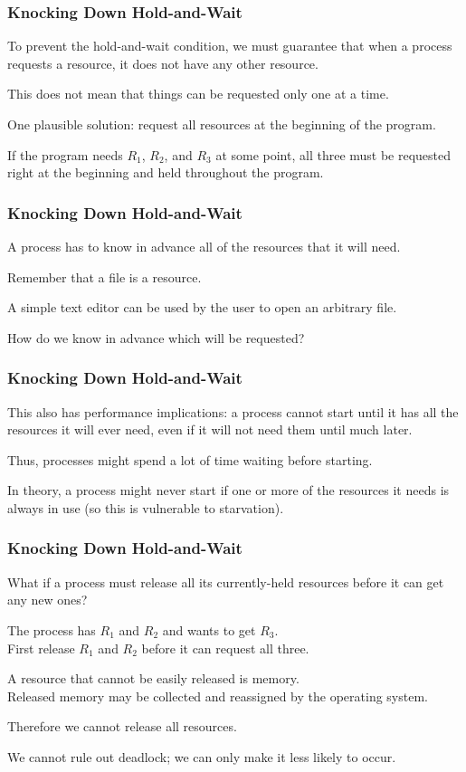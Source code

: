 \begin{frame}
	\frametitle{Knocking Down Hold-and-Wait}
	To prevent the hold-and-wait condition, we must guarantee that when a process requests a resource, it does not have any other resource.

	This does not mean that things can be requested only one at a time.

	One plausible solution: request all resources at the beginning of the program.

	If the program needs $R_{1}$, $R_{2}$, and $R_{3}$ at some point, all three must be requested right at the beginning and held throughout the program.

\end{frame}

\begin{frame}
	\frametitle{Knocking Down Hold-and-Wait}

	A process has to know in advance all of the resources that it will need.

	Remember that a file is a resource.

	A simple text editor can be used by the user to open an arbitrary file.

	How do we know in advance which will be requested?

\end{frame}

\begin{frame}
	\frametitle{Knocking Down Hold-and-Wait}

	This also has performance implications: a process cannot start until it has all the resources it will ever need, even if it will not need them until much later.

	Thus, processes might spend a lot of time waiting before starting.

	In theory, a process might never start if one or more of the resources it needs is always in use (so this is vulnerable to starvation).


\end{frame}

\begin{frame}
	\frametitle{Knocking Down Hold-and-Wait}

	What if a process must release all its currently-held resources before it can get any new ones?

	The process has $R_{1}$ and $R_{2}$ and wants to get $R_{3}$.\\
	\quad First release $R_{1}$ and $R_{2}$ before it can request all three.

	A resource that cannot be easily released is memory.\\
	\quad Released memory may be collected and reassigned by the operating system.

	Therefore we cannot release all resources.

	We cannot rule out deadlock; we can only make it less likely to occur.

\end{frame}

